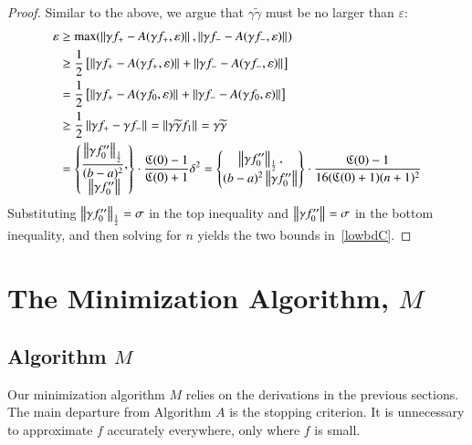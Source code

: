 \documentclass[review]{elsarticle}
\newcommand{\abstol}{\varepsilon}
\theoremstyle{definition}
\newcommand{\tgamma}{\widetilde{\gamma}}
\begin{document}
\begin{proof}
Similar to the above, we argue that $\gamma\tgamma$ must be no larger than
	$\abstol$:
	\begin{align*}
	\abstol & \ge \max(\norm{\gamma f_+-A(\gamma f_+,\abstol)},
	\norm{\gamma f_--A(\gamma f_-, \abstol)}) \\
	& \ge \frac{1}{2} \left[ \norm{\gamma f_+-A(\gamma f_+,\abstol)}
	+ \norm{\gamma f_--A(\gamma f_-, \abstol)} \right] \\
	& = \frac{1}{2} \left[ \norm{\gamma f_+-A(\gamma f_0,\abstol)}
	+ \norm{\gamma f_--A(\gamma f_0, \abstol)} \right] \\
	& \ge \frac{1}{2}  \norm{\gamma f_+ - \gamma f_-} =  \norm{\gamma \tgamma f_1}
	= \gamma \tgamma\\
	& = \begin{Bmatrix} \displaystyle
	\frac{\norm[\frac 12]{\gamma f_0''}}{(b-a)^2}, \\
	\norm{\gamma f_0''}
	\end{Bmatrix}  \cdot \frac{\fC(0)-1}{\fC(0)+1} \delta^2
	 = \begin{Bmatrix} \displaystyle
	\norm[\frac 12]{\gamma f_0''}, \\
	(b-a)^2\norm{\gamma f_0''}
	\end{Bmatrix}  \cdot \frac{\fC(0)-1}{16(\fC(0)+1)(n+1)^2}
	\end{align*}
	Substituting $\norm[\frac12]{\gamma f_0''} = \sigma$ in the top inequality and
	$\norm{\gamma f_0''} = \sigma$ in the bottom inequality, and then solving for
	$n$ yields the two bounds in~\eqref{lowbdC}.
\end{proof}


\section{The Minimization Algorithm, $M$} \label{sec:funmin}

\subsection{Algorithm $M$}  \label{sec:minalgo}

Our minimization algorithm $M$ relies on the derivations in the previous
sections. The main departure from Algorithm $A$ is the stopping criterion. It is
unnecessary to approximate $f$ accurately everywhere,  only where $f$ is small.
\end{document}
